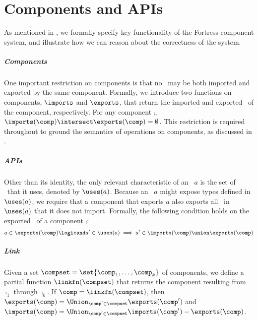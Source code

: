 %
%
%
%

\renewcommand{\api}{a}
\chapter{Components and APIs}


As mentioned in , 
we formally specify key functionality of the Fortress component system,
and illustrate how we can reason about the correctness of the system.

\paragraph{Components}
One important restriction on components is that no \apiN\ may be both
imported and exported by the same component.
Formally, we introduce two functions on components,
$\imports$ and $\exports$,
that return the imported and exported \apisN\ of the component, respectively.
For any component $\comp$, %
$\imports(\comp) \intersect \exports(\comp) = \emptyset$.
This restriction is required throughout to ground the semantics of
operations on components, as discussed in .

\paragraph{APIs}
Other than its identity,
the only relevant characteristic of an \apiN\ $\api$
is the set of \apisN\ that it uses,
denoted by $\uses(\api)$.
Because an \apiN\ $\api$ might expose types
defined in $\uses(\api)$,
we require that a component that exports $\api$
also exports all \apisN\ in $\uses(\api)$ that it does not import.
Formally, the following condition holds on the exported \apisN\
of a component $\comp$:
\[
\api \in \exports(\comp) \logicand \api' \in \uses(\api)
        \implies \api' \in \imports(\comp) \union \exports(\comp)
\]

\paragraph{Link}
Given a set $\compset = \set{\comp_1,\ldots,\comp_k}$ of components,
we define a partial function $\linkfn(\compset)$
that returns the component resulting from $\comp_1$ through $\comp_k$.
If $\comp = \linkfn(\compset)$,
then $\exports(\comp) = \Union_{\comp' \in \compset} \exports(\comp')$
and $\imports(\comp) = \Union_{\comp' \in \compset} \imports(\comp')
                      - \exports(\comp)$.

